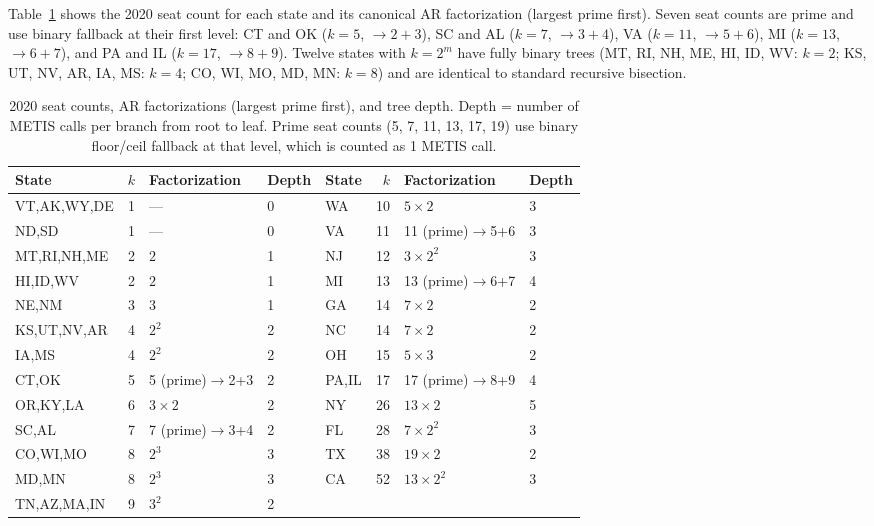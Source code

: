 Table~\ref{tab:factorizations} shows the 2020 seat count for each state and its
canonical AR factorization (largest prime first). Seven seat counts are prime and
use binary fallback at their first level: CT and OK ($k=5$, $\to 2+3$),
SC and AL ($k=7$, $\to 3+4$), VA ($k=11$, $\to 5+6$), MI ($k=13$, $\to 6+7$),
and PA and IL ($k=17$, $\to 8+9$). Twelve states with $k = 2^m$ have fully binary
trees (MT, RI, NH, ME, HI, ID, WV: $k=2$; KS, UT, NV, AR, IA, MS: $k=4$;
CO, WI, MO, MD, MN: $k=8$) and are identical to standard recursive bisection.

\begin{table}[h]
\centering\small
\begin{tabular}{lrll|lrll}
\toprule
State & $k$ & Factorization & Depth &
State & $k$ & Factorization & Depth \\
\midrule
VT,AK,WY,DE  & 1  & ---          & 0 & WA & 10 & $5 \times 2$        & 3 \\
ND,SD         & 1  & ---          & 0 & VA & 11 & 11 (prime)$\to$5+6  & 3 \\
MT,RI,NH,ME  & 2  & $2$          & 1 & NJ & 12 & $3\times 2^2$       & 3 \\
HI,ID,WV     & 2  & $2$          & 1 & MI & 13 & 13 (prime)$\to$6+7  & 4 \\
NE,NM        & 3  & $3$          & 1 & GA & 14 & $7\times 2$         & 2 \\
KS,UT,NV,AR  & 4  & $2^2$        & 2 & NC & 14 & $7\times 2$         & 2 \\
IA,MS        & 4  & $2^2$        & 2 & OH & 15 & $5\times 3$         & 2 \\
CT,OK        & 5  & 5 (prime)$\to$2+3 & 2 & PA,IL & 17 & 17 (prime)$\to$8+9 & 4 \\
OR,KY,LA     & 6  & $3\times 2$  & 2 & NY & 26 & $13\times 2$        & 5 \\
SC,AL        & 7  & 7 (prime)$\to$3+4 & 2 & FL & 28 & $7\times 2^2$  & 3 \\
CO,WI,MO     & 8  & $2^3$        & 3 & TX & 38 & $19\times 2$        & 2 \\
MD,MN        & 8  & $2^3$        & 3 & CA & 52 & $13\times 2^2$      & 3 \\
TN,AZ,MA,IN  & 9  & $3^2$        & 2 & & & & \\
\bottomrule
\end{tabular}
\caption{2020 seat counts, AR factorizations (largest prime first), and tree depth.
  Depth = number of METIS calls per branch from root to leaf.
  Prime seat counts (5, 7, 11, 13, 17, 19) use binary floor/ceil fallback at
  that level, which is counted as 1 METIS call.}
\label{tab:factorizations}
\end{table}

